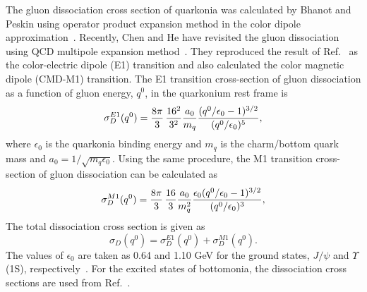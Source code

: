 \documentclass[12pt,a4paper,final]{iopart} %
\newcommand{\Jpsi}{J/\psi}
\begin{document}
The gluon dissociation cross section of quarkonia was calculated by
Bhanot and Peskin using operator product expansion method in the color dipole
approximation~\cite{Bhanot:1979vb}. Recently, Chen and He have revisited the
gluon dissociation using QCD multipole expansion method~\cite{Chen:2017jje}.
They reproduced the result of Ref.~\cite{Bhanot:1979vb} as the color-electric dipole (E1)
transition and also calculated the color magnetic dipole (CMD-M1) transition.
The E1 transition cross-section of gluon dissociation as a function of gluon energy, $q^0$,
in the quarkonium rest frame is~\cite{Bhanot:1979vb}
\begin{equation}
\sigma^{E1}_{D}(q^{0}) = {8\pi \over 3} \, {16^2 \over 3^2} {a_0 \over m_q}  \frac{(q^0/\epsilon_0 - 1)^{3/2}} {(q^0/\epsilon_0)^5},
\end{equation}
 where $\epsilon_0$ is the quarkonia binding energy and $m_q$ is the charm/bottom quark mass 
and $a_0=1/\sqrt{m_q\epsilon_0}$. Using the same procedure, the M1 transition cross-section of gluon 
dissociation can be calculated as~\cite{Chen:2017jje}
\begin{equation}
\sigma^{M1}_{D}(q^{0}) = {8\pi \over 3} \, {16 \over 3 } {a_0 \over m_q^{2}}  \frac{\epsilon_0(q^0/\epsilon_0 - 1)^{3/2}} {(q^0/\epsilon_0)^3},
\end{equation}
The total dissociation cross section is given as 
\begin{equation}
\sigma_D(q^0) = \sigma^{E1}_D(q^0) + \sigma^{M1}_D(q^0).
\end{equation}
The values of $\epsilon_0$ are taken as 0.64 and 1.10 GeV for the ground states, $\Jpsi$ and $\Upsilon$(1S),
respectively~\cite{Karsch:1987pv}. For the excited states of bottomonia, the dissociation cross sections are
used from Ref.~\cite{Chen:2017jje,Oh:2001rm}.
\end{document}
